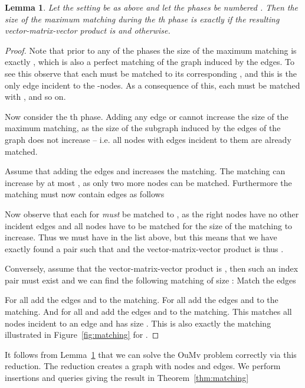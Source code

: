 \documentclass[a4paper,11pt]{article}
\newtheorem{lemma}{Lemma}
\theoremstyle{definition}
\begin{document}
\begin{lemma}\label{lem:max_match}
    Let the setting be as above and let the phases be numbered . Then the size of the maximum matching during the th phase is exactly
     if the resulting vector-matrix-vector product is  and
     otherwise.
\end{lemma}
\begin{proof}
    Note that prior to any of the  phases the size of the maximum matching
    is exactly , which is also a perfect matching of the graph induced
    by the edges. To see this observe that each  must be matched to its corresponding
    , and this is the only edge incident to the
    -nodes. As a consequence of this, each  must be matched
    with , and so on.

    Now consider the th phase. Adding any edge  or
     cannot increase the size of the maximum matching, as the
    size of the subgraph induced by the edges of the graph does not increase --
    i.e. all nodes with edges incident to them are already matched.

    Assume that adding the edges  and 
    increases the matching. The matching can increase by at most , as only
    two more nodes can be matched. Furthermore the matching must now contain
    edges as follows
    
    Now observe that each  for  \emph{must} be matched to
    , as the right nodes have no other incident edges and all nodes have
    to be matched for the size of the matching to increase. Thus we must have
     in the list above, but this means that we have exactly found a pair
     such that  and the vector-matrix-vector
    product is thus .

    Conversely, assume that the vector-matrix-vector product is , then such
    an index pair  must exist and we can find the following matching of
    size : Match the edges
    
    For all  add the edges  and  to
    the matching. For all  add the edges  and
     to the matching. And for all  and  add
    the edges  and  to the matching. This
    matches all nodes incident to an edge and has size . This is also
    exactly the matching illustrated in Figure~\ref{fig:matching} for .
\end{proof}

It follows from Lemma~\ref{lem:max_match} that we can solve the OuMv problem
correctly via this reduction. The reduction creates a graph with  nodes
and  edges. We perform  insertions and  queries giving
the result in Theorem~\ref{thm:matching}
\end{document}
